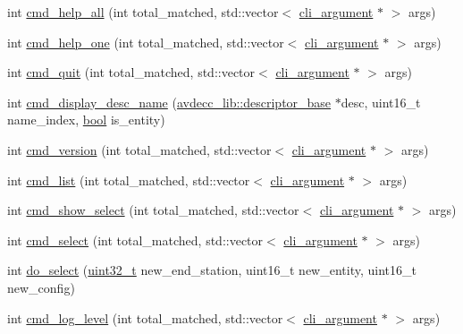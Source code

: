 \begin{DoxyCompactItemize}
\item 
int \hyperlink{classcmd__line_abaa6762e216240b57fd51f06c0a89a86}{cmd\+\_\+help\+\_\+all} (int total\+\_\+matched, std\+::vector$<$ \hyperlink{classcli__argument}{cli\+\_\+argument} $\ast$ $>$ args)
\item 
int \hyperlink{classcmd__line_a9749c9ccd3e99c496d2d44b24227b82e}{cmd\+\_\+help\+\_\+one} (int total\+\_\+matched, std\+::vector$<$ \hyperlink{classcli__argument}{cli\+\_\+argument} $\ast$ $>$ args)
\item 
int \hyperlink{classcmd__line_accdc4c3a6107782d913d315e52716aee}{cmd\+\_\+quit} (int total\+\_\+matched, std\+::vector$<$ \hyperlink{classcli__argument}{cli\+\_\+argument} $\ast$ $>$ args)
\item 
int \hyperlink{classcmd__line_a86dc6edfca6ae559b482840c706f7a1a}{cmd\+\_\+display\+\_\+desc\+\_\+name} (\hyperlink{classavdecc__lib_1_1descriptor__base}{avdecc\+\_\+lib\+::descriptor\+\_\+base} $\ast$desc, uint16\+\_\+t name\+\_\+index, \hyperlink{avb__gptp_8h_af6a258d8f3ee5206d682d799316314b1}{bool} is\+\_\+entity)
\item 
int \hyperlink{classcmd__line_afeb4d6d9e773d7424accff89650161f7}{cmd\+\_\+version} (int total\+\_\+matched, std\+::vector$<$ \hyperlink{classcli__argument}{cli\+\_\+argument} $\ast$ $>$ args)
\item 
int \hyperlink{classcmd__line_a311620e4b2cb2f4f6cab8a372aa3d5f2}{cmd\+\_\+list} (int total\+\_\+matched, std\+::vector$<$ \hyperlink{classcli__argument}{cli\+\_\+argument} $\ast$ $>$ args)
\item 
int \hyperlink{classcmd__line_ab4568bddc5b3f92bd5b52a5898bc1c52}{cmd\+\_\+show\+\_\+select} (int total\+\_\+matched, std\+::vector$<$ \hyperlink{classcli__argument}{cli\+\_\+argument} $\ast$ $>$ args)
\item 
int \hyperlink{classcmd__line_a29f7f3b13e37de847ac9fb12308a1689}{cmd\+\_\+select} (int total\+\_\+matched, std\+::vector$<$ \hyperlink{classcli__argument}{cli\+\_\+argument} $\ast$ $>$ args)
\item 
int \hyperlink{classcmd__line_aa893bad7b6999576e8d4c99ea70c585b}{do\+\_\+select} (\hyperlink{parse_8c_a6eb1e68cc391dd753bc8ce896dbb8315}{uint32\+\_\+t} new\+\_\+end\+\_\+station, uint16\+\_\+t new\+\_\+entity, uint16\+\_\+t new\+\_\+config)
\item 
int \hyperlink{classcmd__line_a3718e0494fbc5641e859f7452aca4832}{cmd\+\_\+log\+\_\+level} (int total\+\_\+matched, std\+::vector$<$ \hyperlink{classcli__argument}{cli\+\_\+argument} $\ast$ $>$ args)
\item 

\end{DoxyCompactItemize}
